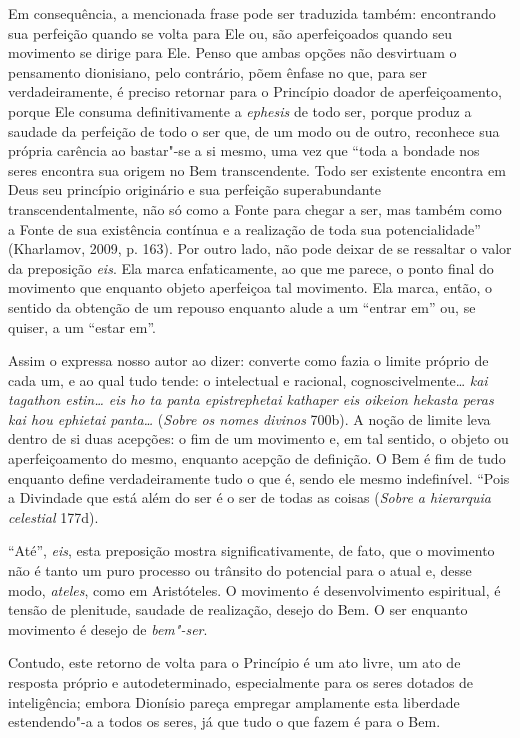 Em consequência, a mencionada frase pode ser traduzida também: encontrando sua
perfeição quando se volta para Ele ou, são aperfeiçoados quando seu movimento se
dirige para Ele. 
Penso que ambas opções não desvirtuam o pensamento dionisiano, pelo contrário,
põem ênfase no que, para ser verdadeiramente, é preciso retornar para o
Princípio doador de aperfeiçoamento, porque Ele consuma definitivamente a
\textit{ephesis} de todo ser, porque produz a saudade da perfeição de todo o ser
que, de um modo ou de outro, reconhece sua própria carência ao bastar"-se a si
mesmo, uma vez que ``toda a bondade nos seres encontra sua origem no Bem
transcendente. Todo ser existente encontra em Deus seu princípio originário e
sua perfeição superabundante transcendentalmente, não só como a Fonte para
chegar a ser, mas também como a Fonte de sua existência contínua e a realização
de toda sua potencialidade'' (Kharlamov, 2009, p. 163). Por outro lado, não pode
deixar de se ressaltar o valor da preposição \textit{eis}. Ela marca
enfaticamente, ao que me parece, o ponto final do movimento que enquanto objeto
aperfeiçoa tal movimento. Ela marca, então, o sentido da obtenção de um repouso
enquanto alude a um ``entrar em''  ou, se quiser, a um ``estar em''.

Assim o expressa nosso autor ao dizer: converte como fazia o limite próprio de
cada um, e ao qual tudo tende: o intelectual e racional, cognoscivelmente\ldots{} 
\textit{kai tagathon estin\ldots{} eis ho ta panta epistrephetai kathaper eis
oikeion hekasta peras kai hou ephietai panta\ldots{}} (\textit{Sobre os nomes
divinos} 700b). A noção de limite leva dentro de si duas acepções: o fim de um
movimento e, em tal sentido, o objeto ou aperfeiçoamento do mesmo, enquanto
acepção de definição. O Bem é fim de tudo enquanto define verdadeiramente tudo o
que é, sendo ele mesmo indefinível. ``Pois a Divindade que está além do ser é o
ser de todas as coisas (\textit{Sobre a hierarquia celestial} 177d).

``Até'', \textit{eis}, esta preposição mostra significativamente, de fato, que o
movimento não é tanto um puro processo ou trânsito do potencial para o atual e,
desse modo, \textit{ateles}, como em Aristóteles. O movimento é desenvolvimento
espiritual, é tensão de plenitude, saudade de realização, desejo do Bem. O ser
enquanto movimento é desejo de \textit{bem"-ser}. 

Contudo, este retorno de volta para o Princípio é um ato livre, um ato de
resposta próprio e autodeterminado, especialmente para os seres dotados de
inteligência; embora Dionísio pareça empregar amplamente esta liberdade
estendendo"-a a todos os seres, já que tudo o que fazem é para o Bem. 

